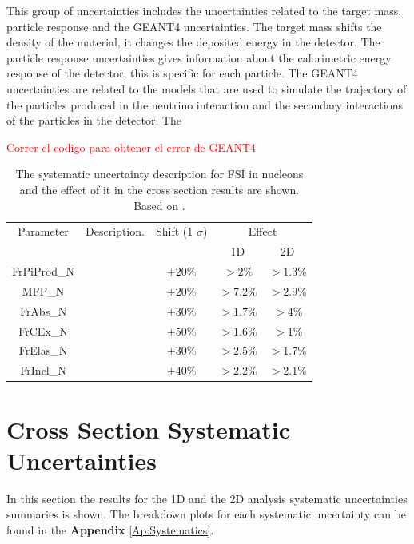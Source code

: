This group of uncertainties includes the uncertainties related to the target mass, particle response and the GEANT4 uncertainties. The target mass shifts the density of the material, it changes the deposited energy in the detector. The particle response uncertainties gives information about the calorimetric energy response of the detector, this is specific for each particle. The GEANT4 uncertainties are related to the models that are used to simulate the trajectory of the particles produced in the neutrino interaction and the secondary interactions of the particles in the detector. The

\textcolor{red}{Correr el codigo para obtener el error de GEANT4}



\begin{table}[!htb]
    \centering
    \begin{tabular}{c|p{2in}|c|c|c}
        \hline 
        Parameter & Description.  & Shift (1 $\sigma$) & \multicolumn{2}{c}{Effect} \\
         & & & 1D & 2D \\
        \hline  
        FrPiProd\_N & & $\pm20\%$ & $>2\%$ & $>1.3\%$\\ \hline
        MFP\_N &  & $\pm20\%$ & $>7.2\%$ & $>2.9\%$ \\ \hline
        FrAbs\_N &  & $\pm30\%$ & $>1.7\%$ & $>4\%$ \\ \hline
        FrCEx\_N &  & $\pm50\%$ & $>1.6\%$ & $>1\%$\\ \hline
        FrElas\_N &  & $\pm30\%$ & $>2.5\%$ & $>1.7\%$ \\ \hline
        FrInel\_N &  & $\pm40\%$ & $>2.2\%$ & $>2.1\%$\\ \hline
        
    \end{tabular}
    \caption{The systematic uncertainty description for FSI in nucleons and the effect of it in the cross section results are shown. Based on \cite{GENIEUnc}.}
    \label{tab:ErrorAnalysis:SystematicUnc:Other}
\end{table}


\pagebreak

\section{Cross Section Systematic Uncertainties}
\label{Cap:ErrorAnalysis:CrossSectionUncertainties}

In this section the results for the 1D and the 2D analysis systematic uncertainties summaries is shown. The breakdown plots for each systematic uncertainty can be found in the \textbf{Appendix} \ref{Ap:Systematics}.


